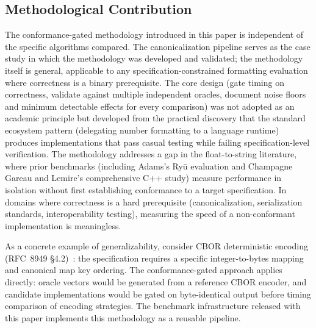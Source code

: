 \subsection{Methodological Contribution}

The conformance-gated methodology introduced in this paper is
independent of the specific algorithms compared.  The \rfcjcs
canonicalization pipeline serves as the case study in which the
methodology was developed and validated; the methodology itself is
general, applicable to any specification-constrained formatting
evaluation where correctness is a binary prerequisite.  The core
design (gate timing on correctness, validate against multiple
independent oracles, document noise floors and minimum detectable
effects for every comparison) was not adopted as an academic
principle but developed from the practical discovery that the standard
ecosystem pattern (delegating number formatting to a language runtime)
produces implementations that pass casual testing while failing
specification-level verification.  The methodology addresses a gap in
the float-to-string literature, where prior benchmarks (including
Adams's Ry\=u evaluation and Champagne Gareau and Lemire's
comprehensive C++ study) measure performance in isolation without
first establishing conformance to a target specification.  In domains
where correctness is a hard prerequisite (canonicalization,
serialization standards, interoperability testing), measuring the
speed of a non-conformant implementation is meaningless.

As a concrete example of generalizability, consider CBOR deterministic
encoding (RFC~8949 \S4.2)~\cite{rfc8949}: the specification requires a
specific integer-to-bytes mapping and canonical map key ordering.  The
conformance-gated approach applies directly: oracle vectors would be
generated from a reference CBOR encoder, and candidate implementations
would be gated on byte-identical output before timing comparison of
encoding strategies.  The benchmark infrastructure released with this
paper implements this methodology as a reusable pipeline.
